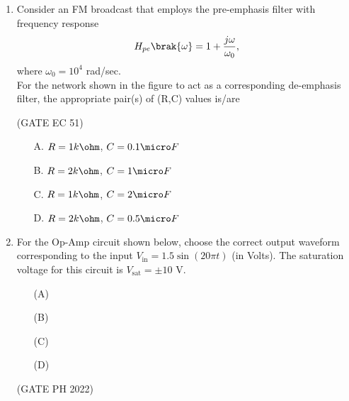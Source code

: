 \begin{enumerate}[label=\thechapter.\arabic*,ref=\thechapter.\theenumi]
\item Consider an FM broadcast that employs the pre-emphasis filter with frequency response \\
    \begin{align*}
        H_{pe}\brak{\omega}= 1+ \frac{j\omega}{\omega _0},
    \end{align*}
    where $\omega_0=10^4$ rad/sec. \\
    For the network shown in the figure to act as a corresponding de-emphasis filter, the
appropriate pair(s) of (R,C) values is/are 
\underline{\hspace{1in}}
\begin{figure}[htb]
  \centering
  
\end{figure}
\hfill(GATE EC 51)\\
\begin{enumerate}
    \item[A.] $R=1k\ohm$, $C=0.1\micro F$
    \item[B.] $R=2k\ohm$, $C=1\micro F$
    \item[C.] $R=1k\ohm$, $C=2\micro F$
    \item[D.] $R=2k\ohm$, $C=0.5\micro F$
\end{enumerate}
\solution

\pagebreak

\item For the Op-Amp circuit shown below, choose the correct output waveform corresponding to the input \( V_{\text{in}} = 1.5 \sin(20 \pi t) \) (in Volts). The saturation voltage for this circuit is \( V_{\text{sat}} = \pm 10 \) V.
\begin{figure}[ht]
\centering
    
\end{figure}
\begin{enumerate}
  \item[(A)]
  \begin{figure}[ht!]
    \centering
    
\end{figure}
  \item[(B)]  
  \begin{figure}[ht]
    \centering
    
\end{figure}
  \item[(C)] 
  \begin{figure}[ht]
    \centering
    
\end{figure}
  \item[(D)] 
   \begin{figure}[ht]
    \centering
    
\end{figure}
\end{enumerate}

\hfill{(GATE PH 2022)}\\
\solution

\pagebreak
\end{enumerate}
